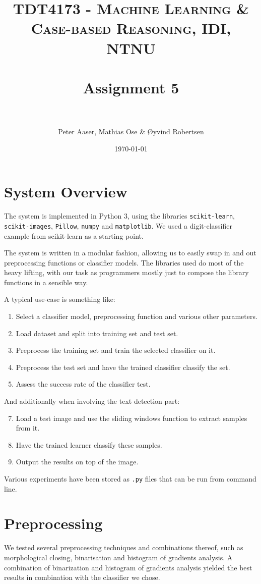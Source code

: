 \documentclass[paper=a4, fontsize=11pt]{scrartcl} %
\title{	
    \normalfont \normalsize 
    \textsc{TDT4173 - Machine Learning \& Case-based Reasoning, IDI, NTNU} \\ [25pt] %
    \horrule{0.5pt} \\[0.4cm] %
    \huge Assignment 5 \\ %
    \horrule{2pt} \\[0.5cm] %
}
\author{Peter Aaser, Mathias Ose \& Øyvind Robertsen} %
\date{\normalsize\today} %
\numberwithin{equation}{section} %
\numberwithin{figure}{section} %
\numberwithin{table}{section} %
\begin{document}
\maketitle %

\section{System Overview}
The system is implemented in Python 3, using the libraries \texttt{scikit-learn}, \texttt{scikit-images}, \texttt{Pillow}, \texttt{numpy} and \texttt{matplotlib}.
We used a digit-classifier example from scikit-learn \cite{bib:scikit-digits} as a starting point.

The system is written in a modular fashion, allowing us to easily swap in and out preprocessing functions or classifier models.
The libraries used do most of the heavy lifting, with our task as programmers mostly just to compose the library functions in a sensible way.

A typical use-case is something like:
\begin{enumerate}
    \item   Select a classifier model, preprocessing function and various other parameters.
    \item   Load dataset and split into training set and test set.
    \item   Preprocess the training set and train the selected classifier on it.
    \item   Preprocess the test set and have the trained classifier classify the set.
    \item   Assess the success rate of the classifier test.
\end{enumerate}

And additionally when involving the text detection part:
\begin{enumerate}
    \setcounter{enumi}{6}
    \item   Load a test image and use the sliding windows function to extract samples from it.
    \item   Have the trained learner classify these samples.
    \item   Output the results on top of the image.
\end{enumerate}

Various experiments have been stored as \texttt{.py} files that can be run from command line.

\section{Preprocessing}
We tested several preprocessing techniques and combinations thereof,
such as morphological closing, binarisation and histogram of gradients
analysis.  A combination of binarization and histogram of gradients
analysis yielded the best results in combination with the classifier
we chose.
\end{document}

